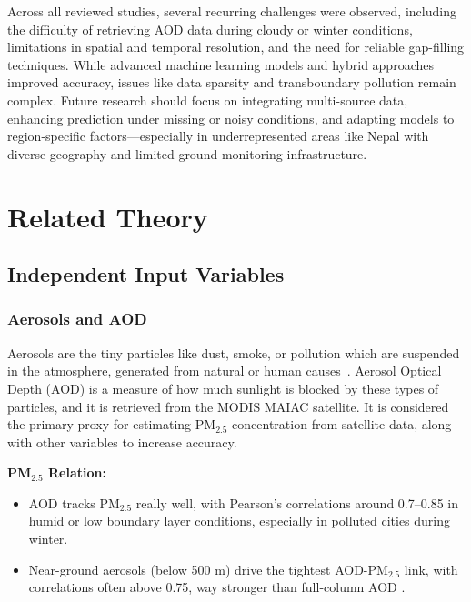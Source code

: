 \documentclass[12pt]{report}
\begin{document}
\noindent
Across all reviewed studies, several recurring challenges were observed, including the difficulty of retrieving AOD data during cloudy or winter conditions, limitations in spatial and temporal resolution, and the need for reliable gap-filling techniques. While advanced machine learning models and hybrid approaches improved accuracy, issues like data sparsity and transboundary pollution remain complex. Future research should focus on integrating multi-source data, enhancing prediction under missing or noisy conditions, and adapting models to region-specific factors—especially in underrepresented areas like Nepal with diverse geography and limited ground monitoring infrastructure.



\chapter{Related Theory}

\section{Independent Input Variables}

\subsection*{Aerosols and AOD}

Aerosols are the tiny particles like dust, smoke, or pollution which are suspended in the atmosphere, generated from natural or human causes~\cite{aerosolPM}. Aerosol Optical Depth (AOD) is a measure of how much sunlight is blocked by these types of particles, and it is retrieved from the MODIS MAIAC satellite. It is considered the primary proxy for estimating PM$_{2.5}$ concentration from satellite data, along with other variables to increase accuracy.

\noindent\textbf{PM$_{2.5}$ Relation:}

\begin{itemize}
    \item AOD tracks PM$_{2.5}$ really well, with Pearson's correlations around 0.7–0.85 in humid or low boundary layer conditions, especially in polluted cities during winter.   
    \item Near-ground aerosols (below 500 m) drive the tightest AOD-PM$_{2.5}$ link, with correlations often above 0.75, way stronger than full-column AOD \cite{aodpm25}.
\end{itemize}
\end{document}
